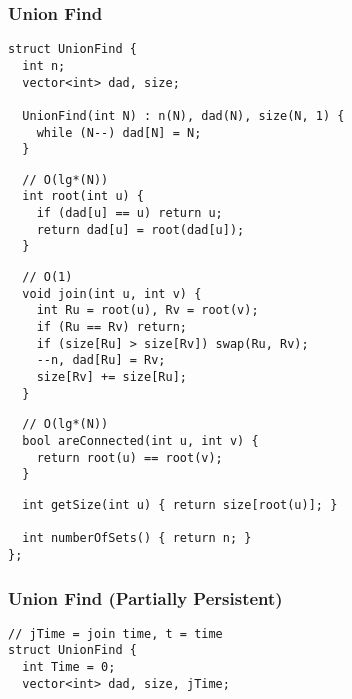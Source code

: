 \documentclass[twoside]{article}
\begin{document}
\begin{multicols*}{2}
\subsubsection*{Union Find}
\begin{verbatim}
struct UnionFind {
  int n;
  vector<int> dad, size;

  UnionFind(int N) : n(N), dad(N), size(N, 1) {
    while (N--) dad[N] = N;
  }
\end{verbatim}
\vspace{-12pt}
\begin{verbatim}
  // O(lg*(N))
  int root(int u) {
    if (dad[u] == u) return u;
    return dad[u] = root(dad[u]);
  }
\end{verbatim}
\vspace{-12pt}
\begin{verbatim}
  // O(1)
  void join(int u, int v) {
    int Ru = root(u), Rv = root(v);
    if (Ru == Rv) return;
    if (size[Ru] > size[Rv]) swap(Ru, Rv);
    --n, dad[Ru] = Rv;
    size[Rv] += size[Ru];
  }
\end{verbatim}
\vspace{-12pt}
\begin{verbatim}
  // O(lg*(N))
  bool areConnected(int u, int v) {
    return root(u) == root(v);
  }
\end{verbatim}
\vspace{-12pt}
\begin{verbatim}
  int getSize(int u) { return size[root(u)]; }

  int numberOfSets() { return n; }
};
\end{verbatim}

\subsubsectionfont{\large\bfseries\sffamily\underline}
\subsubsection*{Union Find (Partially Persistent)}
\begin{verbatim}
// jTime = join time, t = time
struct UnionFind {
  int Time = 0;
  vector<int> dad, size, jTime;


\end{verbatim}
\end{multicols*}
\end{document}
